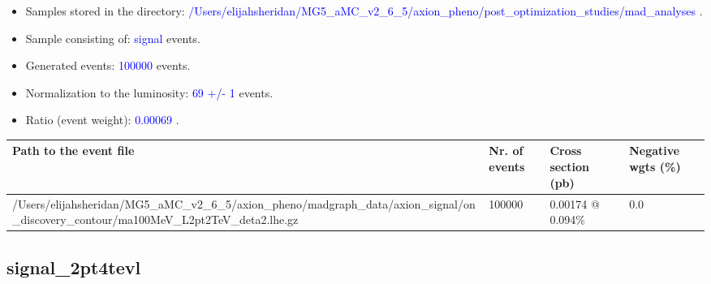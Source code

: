 \documentclass[a4paper, 10pt]{article}
\begin{document}
\begin{itemize}
  \item Samples stored in the directory: \textcolor{blue}{/\-Users/\-elijahsheridan/\-MG5\_aMC\_v2\_6\_5/\-axion\_pheno/\-post\_optimization\_studies/\-mad\_analyses} .
   \item Sample consisting of: \textcolor{blue}{signal}  events.
   \item Generated events: \textcolor{blue}{100000 }  events.
   \item Normalization to the luminosity: \textcolor{blue}{69}\textcolor{blue}{ +/\-- }\textcolor{blue}{1 }  events.
   \item Ratio (event weight): \textcolor{blue}{0.00069 } .  
 
\end{itemize}
\begin{table}[H]
  \begin{center}
    \begin{tabular}{|m{55.0mm}|m{25.0mm}|m{30.0mm}|m{30.0mm}|}
      \hline
      {\cellcolor{yellow}         Path to the event file}& {\cellcolor{yellow}         Nr. of events}& {\cellcolor{yellow}         Cross section (pb)}& {\cellcolor{yellow}         Negative wgts (\%)}\\
      \hline
      {\cellcolor{white}          /\-Users/\-elijahsheridan/\-MG5\_aMC\_v2\_6\_5/\-axion\_pheno/\-madgraph\_data/\-axion\_signal/\-on\_discovery\_contour/\-ma100MeV\_L2pt2TeV\_deta2.lhe.gz}& {\cellcolor{white}          100000}& {\cellcolor{white}          0.00174 @ 0.094\%}& {\cellcolor{white}          0.0}\\
\hline
    \end{tabular}
  \end{center}
\end{table}

\subsection{ signal\_2pt4tevl}
\end{document}

